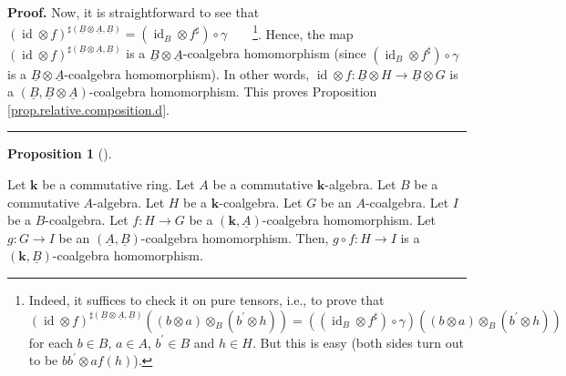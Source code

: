 \documentclass
[numbers=enddot,12pt,final,onecolumn,notitlepage,abstracton]{scrartcl}%
\theoremstyle{definition}
\newtheorem{prop}[theo]{Proposition}
\newenvironment{proposition}[1][]
{\begin{prop}[#1]\begin{leftbar}}
{\end{leftbar}\end{prop}}
\newenvironment{proof}[1][Proof]{\noindent\textbf{#1.} }{\ \rule{0.5em}{0.5em}}
\begin{document}
\begin{proof}
Now, it is straightforward to see that $\left(  \operatorname*{id}\otimes
f\right)  ^{\sharp\left(  \underline{B}\otimes\underline{A},\underline{B}%
\right)  }=\left(  \operatorname*{id}\nolimits_{B}\otimes f^{\sharp}\right)
\circ\gamma$\ \ \ \ \footnote{Indeed, it suffices to check it on pure tensors,
i.e., to prove that
\[
\left(  \operatorname*{id}\otimes f\right)  ^{\sharp\left(  \underline{B}%
\otimes\underline{A},\underline{B}\right)  }\left(  \left(  b\otimes a\right)
\otimes_{B}\left(  b^{\prime}\otimes h\right)  \right)  =\left(  \left(
\operatorname*{id}\nolimits_{B}\otimes f^{\sharp}\right)  \circ\gamma\right)
\left(  \left(  b\otimes a\right)  \otimes_{B}\left(  b^{\prime}\otimes
h\right)  \right)
\]
for each $b\in B$, $a\in A$, $b^{\prime}\in B$ and $h\in H$. But this is easy
(both sides turn out to be $bb^{\prime}\otimes af\left(  h\right)  $).}.
Hence, the map $\left(  \operatorname*{id}\otimes f\right)  ^{\sharp\left(
\underline{B}\otimes\underline{A},\underline{B}\right)  }$ is a $\underline{B}%
\otimes\underline{A}$-coalgebra homomorphism (since $\left(
\operatorname*{id}\nolimits_{B}\otimes f^{\sharp}\right)  \circ\gamma$ is a
$\underline{B}\otimes\underline{A}$-coalgebra homomorphism). In other words,
$\operatorname*{id}\otimes f:\underline{B}\otimes H\rightarrow\underline{B}%
\otimes G$ is a $\left(  \underline{B},\underline{B}\otimes\underline{A}%
\right)  $-coalgebra homomorphism. This proves Proposition
\ref{prop.relative.composition.d}.
\end{proof}

\begin{proposition}
\label{prop.relative.composition.e}Let $\mathbf{k}$ be a commutative ring. Let
$A$ be a commutative $\mathbf{k}$-algebra. Let $B$ be a commutative
$A$-algebra. Let $H$ be a $\mathbf{k}$-coalgebra. Let $G$ be an $A$-coalgebra.
Let $I$ be a $B$-coalgebra. Let $f:H\rightarrow G$ be a $\left(
\mathbf{k},\underline{A}\right)  $-coalgebra homomorphism. Let $g:G\rightarrow
I$ be an $\left(  \underline{A},\underline{B}\right)  $-coalgebra
homomorphism. Then, $g\circ f:H\rightarrow I$ is a $\left(  \mathbf{k}%
,\underline{B}\right)  $-coalgebra homomorphism.
\end{proposition}
\end{document}
